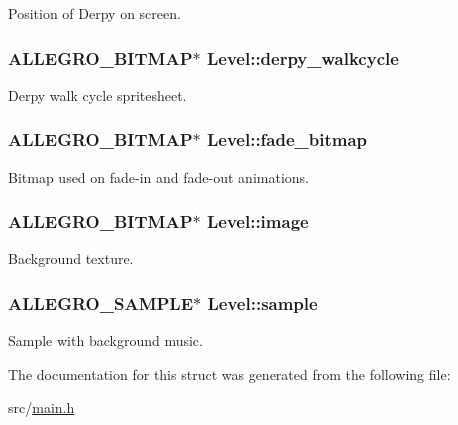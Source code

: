 \-Position of \-Derpy on screen. \hypertarget{structLevel_ab6a78c50cda8424f722ca249f5466f67}{
\subsubsection[{derpy\-\_\-walkcycle}]{\setlength{\rightskip}{0pt plus 5cm}\-A\-L\-L\-E\-G\-R\-O\-\_\-\-B\-I\-T\-M\-A\-P$\ast$ {\bf \-Level\-::derpy\-\_\-walkcycle}}}\label{structLevel_ab6a78c50cda8424f722ca249f5466f67}
\-Derpy walk cycle spritesheet. \hypertarget{structLevel_a1a9629222f6536790772ad7af5d2413c}{
\subsubsection[{fade\-\_\-bitmap}]{\setlength{\rightskip}{0pt plus 5cm}\-A\-L\-L\-E\-G\-R\-O\-\_\-\-B\-I\-T\-M\-A\-P$\ast$ {\bf \-Level\-::fade\-\_\-bitmap}}}\label{structLevel_a1a9629222f6536790772ad7af5d2413c}
\-Bitmap used on fade-\/in and fade-\/out animations. \hypertarget{structLevel_a29a3fe4b6d80ae62843840aa6afa0596}{
\subsubsection[{image}]{\setlength{\rightskip}{0pt plus 5cm}\-A\-L\-L\-E\-G\-R\-O\-\_\-\-B\-I\-T\-M\-A\-P$\ast$ {\bf \-Level\-::image}}}\label{structLevel_a29a3fe4b6d80ae62843840aa6afa0596}
\-Background texture. \hypertarget{structLevel_a234fa7b9ec35dd360e4e3c48a944fc7d}{
\subsubsection[{sample}]{\setlength{\rightskip}{0pt plus 5cm}\-A\-L\-L\-E\-G\-R\-O\-\_\-\-S\-A\-M\-P\-L\-E$\ast$ {\bf \-Level\-::sample}}}\label{structLevel_a234fa7b9ec35dd360e4e3c48a944fc7d}
\-Sample with background music. 

\-The documentation for this struct was generated from the following file\-:\begin{DoxyCompactItemize}
\item 
src/\hyperlink{main_8h}{main.\-h}\end{DoxyCompactItemize}
